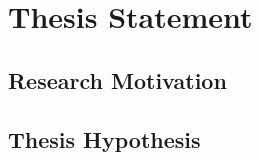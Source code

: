 \documentclass[thesis.tex]{subfiles}
\begin{document}
\chapter{Thesis Statement}
\label{chap:thesis-statement}


\section{Research Motivation}



\section{Thesis Hypothesis}
\end{document}
